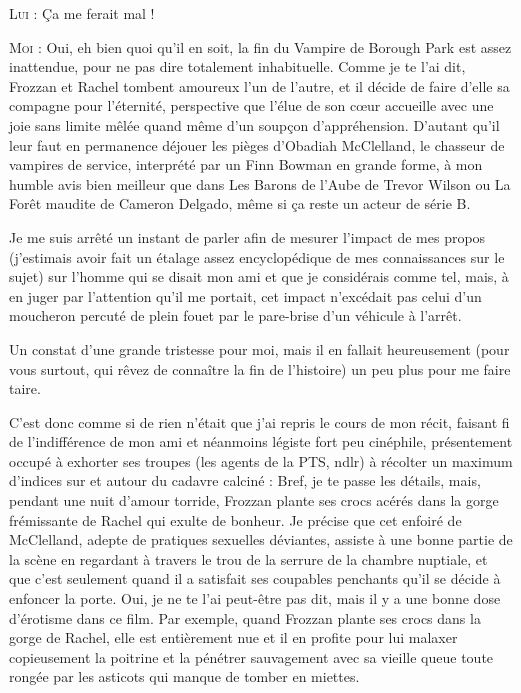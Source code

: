 \begin{dialogue}
\textsc{Lui} : Ça me ferait mal !

\textsc{Moi} : Oui, eh bien quoi qu’il en soit, la fin du Vampire de Borough Park est assez inattendue, pour ne pas dire totalement inhabituelle. Comme je te l’ai dit, Frozzan et Rachel tombent amoureux l’un de l’autre, et il décide de faire d’elle sa compagne pour l’éternité, perspective que l’élue de son cœur accueille avec une joie sans limite mêlée quand même d’un soupçon d’appréhension. D’autant qu’il leur faut en permanence déjouer les pièges d’Obadiah McClelland, le chasseur de vampires de service, interprété par un Finn Bowman en grande forme, à mon humble avis bien meilleur que dans Les Barons de l’Aube de Trevor Wilson ou La Forêt maudite de Cameron Delgado, même si ça reste un acteur de série B.

\end{dialogue}

Je me suis arrêté un instant de parler afin de mesurer l’impact de mes propos (j’estimais avoir fait un étalage assez encyclopédique de mes connaissances sur le sujet) sur l’homme qui se disait mon ami et que je considérais comme tel, mais, à en juger par l’attention qu’il me portait, cet impact n’excédait pas celui d’un moucheron percuté de plein fouet par le pare-brise d’un véhicule à l’arrêt.

Un constat d’une grande tristesse pour moi, mais il en fallait heureusement (pour vous surtout, qui rêvez de connaître la fin de l’histoire) un peu plus pour me faire taire.

C’est donc comme si de rien n’était que j’ai repris le cours de mon récit, faisant fi de l’indifférence de mon ami et néanmoins légiste fort peu cinéphile, présentement occupé à exhorter ses troupes (les agents de la PTS, ndlr) à récolter un maximum d’indices sur et autour du cadavre calciné : Bref, je te passe les détails, mais, pendant une nuit d’amour torride, Frozzan plante ses crocs acérés dans la gorge frémissante de Rachel qui exulte de bonheur. Je précise que cet enfoiré de McClelland, adepte de pratiques sexuelles déviantes, assiste à une bonne partie de la scène en regardant à travers le trou de la serrure de la chambre nuptiale, et que c’est seulement quand il a satisfait ses coupables penchants qu’il se décide à enfoncer la porte. Oui, je ne te l’ai peut-être pas dit, mais il y a une bonne dose d’érotisme dans ce film. Par exemple, quand Frozzan plante ses crocs dans la gorge de Rachel, elle est entièrement nue et il en profite pour lui malaxer copieusement la poitrine et la pénétrer sauvagement avec sa vieille queue toute rongée par les asticots qui manque de tomber en miettes.

